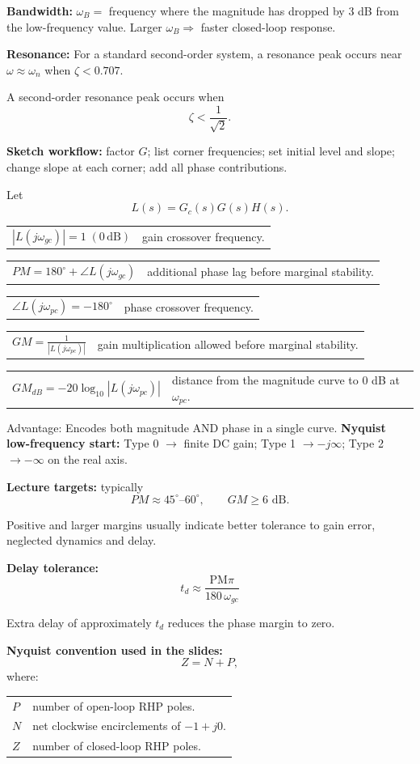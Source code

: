 \documentclass[a4paper,8pt]{extarticle}
\makeatletter
\newcommand{\topicdot}[1]{\tikz[baseline=-0.48ex]\fill[#1] (0,0) circle (0.64ex);}
\newcommand{\Fdot}{\topicdot{freqDot}}
\newcommand{\mybox}[2]{
\begin{tcolorbox}[
  enhanced,
  colback=lightblue!4!white,
  colframe=lightblue!76!black,
  colbacktitle=lightblue!49!white,
  boxrule=0.25pt,
  boxsep=0.25pt,
  left=0.75pt,right=0.75pt,top=0.55pt,bottom=0.55pt,
  toptitle=0.35pt,bottomtitle=0.25pt,
  arc=0.45pt,outer arc=0.45pt,
  title={\fontsize{4.85pt}{5.05pt}\selectfont\textbf{#1}},
  fonttitle=\bfseries,
  coltitle=black,
  before skip=0.55pt,after skip=0.55pt,
  fontupper=\fontsize{4.15pt}{4.52pt}\selectfont\RaggedRight
]
#2
\end{tcolorbox}}
\newcommand{\frow}[2]{%
\begin{tabularx}{\linewidth}{@{}>{$\displaystyle}l<{$}@{\hspace{3pt}}X@{}}
#1 & #2
\end{tabularx}\vspace{0.05pt}}
\newcommand{\tinyhead}[1]{\textbf{#1}\;}
\makeatother
\begin{document}
\begin{multicols}{4}
{\tinyhead{Bandwidth:} $\omega_B=$ frequency where the magnitude has dropped by $3$ dB from the low-frequency value. Larger $\omega_B\Rightarrow$ faster closed-loop response.

\tinyhead{Resonance:} For a standard second-order system, a resonance peak occurs near $\omega\approx\omega_n$ when $\zeta<0.707$.

A second-order resonance peak occurs when
\[
\zeta<\frac{1}{\sqrt2}.
\]

\tinyhead{Sketch workflow:}
factor $G$; list corner frequencies; set initial level and slope; change slope at each corner; add all phase contributions.
}

\mybox{GM, PM, Nyquist \& Robustness \Fdot}{
Let
\[
L(s)=G_c(s)G(s)H(s).
\]

\frow{|L(j\omega_{gc})|=1\;(0\,\mathrm{dB})}
{gain crossover frequency.}

\frow{PM=180^\circ+\angle L(j\omega_{gc})}
{additional phase lag before marginal stability.}

\frow{\angle L(j\omega_{pc})=-180^\circ}
{phase crossover frequency.}

\frow{GM=\frac{1}{|L(j\omega_{pc})|}}
{gain multiplication allowed before marginal stability.}

\frow{GM_{dB}=-20\log_{10}|L(j\omega_{pc})|}
{distance from the magnitude curve to $0$ dB at $\omega_{pc}$.}

Advantage: Encodes both magnitude AND phase in a single curve.
\tinyhead{Nyquist low-frequency start:}
Type 0 $\rightarrow$ finite DC gain;\quad
Type 1 $\rightarrow -j\infty$;\quad
Type 2 $\rightarrow -\infty$ on the real axis.

\tinyhead{Lecture targets:}
typically
\[
PM\approx45^\circ\text{--}60^\circ,
\qquad
GM\geq6\text{ dB}.
\]

Positive and larger margins usually indicate better tolerance to gain error, neglected dynamics and delay.

\tinyhead{Delay tolerance:}
\[
t_d\approx\frac{\mathrm{PM}\pi}{180\,\omega_{gc}}
\]

Extra delay of approximately $t_d$ reduces the phase margin to zero.

\tinyhead{Nyquist convention used in the slides:}
\[
Z=N+P,
\]
where:

\begin{tabularx}{\linewidth}{@{}lX@{}}
$P$ & number of open-loop RHP poles.\\
$N$ & net clockwise encirclements of $-1+j0$.\\
$Z$ & number of closed-loop RHP poles.\\
\end{tabularx}

}
\end{multicols}
\end{document}
